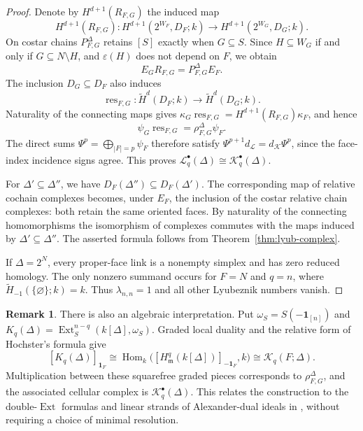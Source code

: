 \documentclass[11pt]{article}
\theoremstyle{plain}
\theoremstyle{definition}
\newtheorem{remark}[theorem]{Remark}
\newcommand{\kk}{k}
\newcommand{\mm}{\mathfrak{m}}
\newcommand{\Ext}{\operatorname{Ext}}
\newcommand{\rH}{\widetilde{H}}
\newcommand{\Hloc}[2]{H^{#1}_{#2}}
\newcommand{\one}{\mathbf 1}
\newcommand{\Lc}{\mathcal L}
\newcommand{\Kc}{\mathcal K}
\begin{document}
\begin{proof}
Denote by $H^{d+1}(R_{F,G})$ the induced map
\[
H^{d+1}(R_{F,G}):
H^{d+1}(2^{W_F},D_F;\kk)
\longrightarrow
H^{d+1}(2^{W_G},D_G;\kk).
\]
On costar chains $P_{F,G}^\Delta$ retains $[S]$ exactly when $G\subseteq S$. Since $H\subseteq W_G$ if and only if $G\subseteq N\setminus H$, and $\varepsilon(H)$ does not depend on $F$, we obtain
\[
E_G R_{F,G}=P_{F,G}^\Delta E_F.
\]
The inclusion $D_G\subseteq D_F$ also induces
\[
\operatorname{res}_{F,G}:\rH^d(D_F;\kk)\longrightarrow\rH^d(D_G;\kk).
\]
Naturality of the connecting maps gives $\kappa_G\operatorname{res}_{F,G}=H^{d+1}(R_{F,G})\kappa_F$, and hence
\[
\psi_G\operatorname{res}_{F,G}=\rho^\Delta_{F,G}\psi_F.
\]
The direct sums $\Psi^p=\bigoplus_{|F|=p}\psi_F$ therefore satisfy $\Psi^{p+1}d_{\Lc}=d_{\Kc}\Psi^p$, since the face-index incidence signs agree. This proves $\Lc_q^\bullet(\Delta)\cong\Kc_q^\bullet(\Delta)$.

For $\Delta'\subseteq\Delta''$, we have $D_F(\Delta'')\subseteq D_F(\Delta')$. The corresponding map of relative cochain complexes becomes, under $E_F$, the inclusion of the costar relative chain complexes: both retain the same oriented faces. By naturality of the connecting homomorphisms the isomorphism of complexes commutes with the maps induced by $\Delta'\subseteq\Delta''$. The asserted formula follows from Theorem~\ref{thm:lyub-complex}.

If $\Delta=2^N$, every proper-face link is a nonempty simplex and has zero reduced homology. The only nonzero summand occurs for $F=N$ and $q=n$, where $\rH_{-1}(\{\varnothing\};\kk)=\kk$. Thus $\lambda_{n,n}=1$ and all other Lyubeznik numbers vanish.
\end{proof}

\begin{remark}\label{rem:squarefree-face-link}
There is also an algebraic interpretation. Put $\omega_S=S(-\one_{[n]})$ and $K_q(\Delta)=\Ext_S^{n-q}(\kk[\Delta],\omega_S)$. Graded local duality and the relative form of Hochster's formula give
\[
[K_q(\Delta)]_{\one_F}\cong\operatorname{Hom}_\kk\bigl([\Hloc{q}{\mm}(\kk[\Delta])]_{-\one_F},\kk\bigr)
\cong\Kc_q(F;\Delta).
\]
Multiplication between these squarefree graded pieces corresponds to $\rho^\Delta_{F,G}$, and the associated cellular complex is $\Kc_q^\bullet(\Delta)$. This relates the construction to the double-$\Ext$ formulas and linear strands of Alexander-dual ideals in \cite{Yanagawa2000,AlvarezMontanerVahidi,AlvarezMontanerYanagawa}, without requiring a choice of minimal resolution.
\end{remark}
\end{document}
